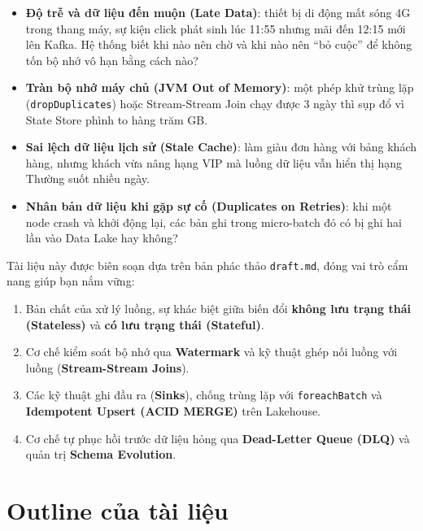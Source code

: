 \documentclass[12pt]{article}
\begin{document}
\begin{itemize}
    \item \textbf{Độ trễ và dữ liệu đến muộn (Late Data)}: thiết bị di động mất sóng 4G trong thang máy, sự kiện click phát sinh lúc 11:55 nhưng mãi đến 12:15 mới lên Kafka. Hệ thống biết khi nào nên chờ và khi nào nên ``bỏ cuộc'' để không tốn bộ nhớ vô hạn bằng cách nào?
    \item \textbf{Tràn bộ nhớ máy chủ (JVM Out of Memory)}: một phép khử trùng lặp (\texttt{dropDuplicates}) hoặc Stream-Stream Join chạy được 3 ngày thì sụp đổ vì State Store phình to hàng trăm GB.
    \item \textbf{Sai lệch dữ liệu lịch sử (Stale Cache)}: làm giàu đơn hàng với bảng khách hàng, nhưng khách vừa nâng hạng VIP mà luồng dữ liệu vẫn hiển thị hạng Thường suốt nhiều ngày.
    \item \textbf{Nhân bản dữ liệu khi gặp sự cố (Duplicates on Retries)}: khi một node crash và khởi động lại, các bản ghi trong micro-batch đó có bị ghi hai lần vào Data Lake hay không?
\end{itemize}

Tài liệu này được biên soạn dựa trên bản phác thảo \texttt{draft.md}, đóng vai trò cẩm nang giúp bạn nắm vững:
\begin{enumerate}
    \item Bản chất của xử lý luồng, sự khác biệt giữa biến đổi \textbf{không lưu trạng thái (Stateless)} và \textbf{có lưu trạng thái (Stateful)}.
    \item Cơ chế kiểm soát bộ nhớ qua \textbf{Watermark} và kỹ thuật ghép nối luồng với luồng (\textbf{Stream-Stream Joins}).
    \item Các kỹ thuật ghi đầu ra (\textbf{Sinks}), chống trùng lặp với \texttt{foreachBatch} và \textbf{Idempotent Upsert (ACID MERGE)} trên Lakehouse.
    \item Cơ chế tự phục hồi trước dữ liệu hỏng qua \textbf{Dead-Letter Queue (DLQ)} và quản trị \textbf{Schema Evolution}.
\end{enumerate}

\section{Outline của tài liệu}
\end{document}
